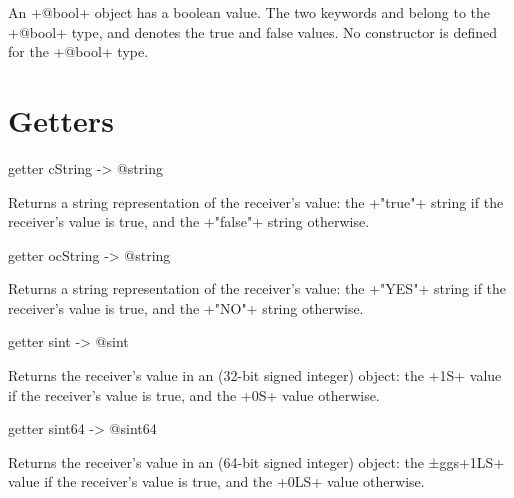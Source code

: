 

An \ggs+@bool+ object has a boolean value. The two keywords  and  belong to the \ggs+@bool+ type, and denotes the true and false values. No constructor is defined for the \ggs+@bool+ type.

\section{Getters}


\begin{galgascode}
getter cString -> @string
\end{galgascode}

Returns a string representation of the receiver's value: the \ggs+"true"+ string if the receiver's value is true, and the \ggs+"false"+ string otherwise.








\begin{galgascode}
getter ocString -> @string
\end{galgascode}

Returns a string representation of the receiver's value: the \ggs+"YES"+ string if the receiver's value is true, and the \ggs+"NO"+ string otherwise.





\begin{galgascode}
getter sint -> @sint
\end{galgascode}

Returns the receiver's value in an  (32-bit signed integer) object: the \ggs+1S+  value if the receiver's value is true, and the \ggs+0S+  value otherwise.





\begin{galgascode}
getter sint64 -> @sint64
\end{galgascode}

Returns the receiver's value in an  (64-bit signed integer) object: the ±ggs+1LS+  value if the receiver's value is true, and the \ggs+0LS+  value otherwise.




